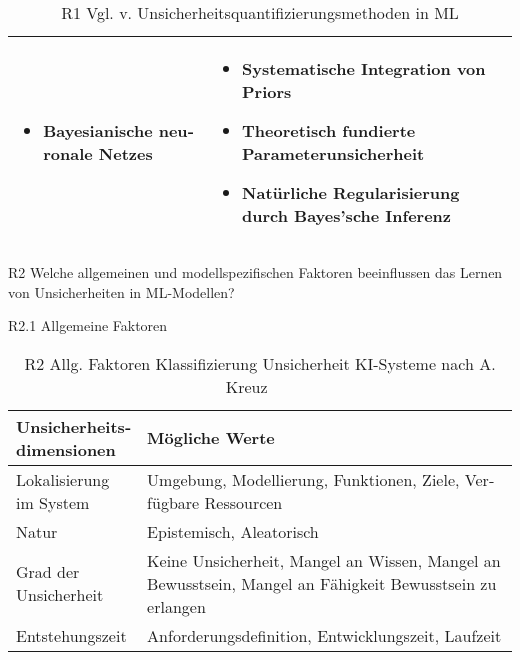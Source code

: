 \begin{otherlanguage}{ngerman}
\begin{table}[!htpb]
\begin{tabularx}{\textwidth}{|l|X|}
\begin{itemize}[topsep=0em, itemsep=0em, left=0em, labelsep=0.25em]
      \item \gls{Bayesianische neuronale Netze}s
    \end{itemize} & 
    \begin{itemize}[topsep=0em, itemsep=0em, left=0em, labelsep=0.25em]
      \item Systematische Integration von Priors
      \item Theoretisch fundierte Parameterunsicherheit
      \item Natürliche Regularisierung durch Bayes'sche Inferenz
    \end{itemize} \\
    \hline
  \end{tabularx}
  \caption{R1 Vgl. v. Unsicherheitsquantifizierungsmethoden in ML}\label{tab:chapter6r1}
\end{table}



\newpage


R2 Welche allgemeinen und modellspezifischen Faktoren beeinflussen das Lernen von Unsicherheiten in ML-Modellen?

\newline
R2.1 Allgemeine Faktoren

\begin{table}[!htpb]
  \begin{tabularx}{\textwidth}{|l|X|}
    \hline
    \textbf{Unsicherheitsdimensionen} & \textbf{Mögliche Werte} \\
    \hline
    Lokalisierung im System & Umgebung, Modellierung, Funktionen, Ziele, Verfügbare Ressourcen \\
    \hline
    Natur & Epistemisch, Aleatorisch \\
    \hline
    Grad der Unsicherheit & Keine Unsicherheit, Mangel an Wissen, Mangel an Bewusstsein, Mangel an Fähigkeit Bewusstsein zu erlangen \\
    \hline
    Entstehungszeit & Anforderungsdefinition, Entwicklungszeit, Laufzeit \\
    \hline
  \end{tabularx}
  \caption{R2 Allg. Faktoren Klassifizierung Unsicherheit KI-Systeme nach A. Kreuz ~\nocite{AndreasKreutz2022} ~\nocite{AndreasKreutz2022b}}\label{tab:chapter6r21}
\end{table}


\end{otherlanguage}
